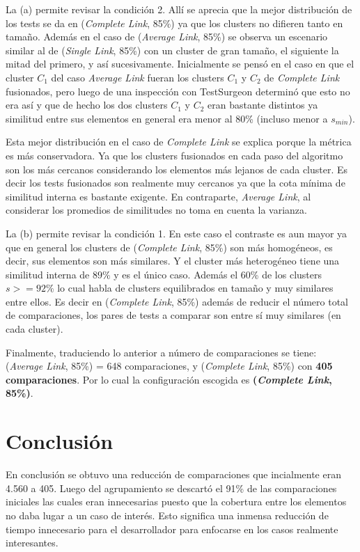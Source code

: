 \par La (a) permite revisar la condición 2. Allí se aprecia que la mejor distribución de los tests se da en (\emph{Complete Link}, 85\%) ya que los clusters no difieren tanto en tamaño. Además en el caso de (\emph{Average Link}, 85\%) se observa un escenario similar al de (\emph{Single Link}, 85\%) con un cluster de gran tamaño, el siguiente la mitad del primero, y así sucesivamente. Inicialmente se pensó en el caso en que el cluster $C_1$ del caso \emph{Average Link} fueran los clusters $C_1$ y $C_2$ de \emph{Complete Link} fusionados, pero luego de una inspección con TestSurgeon determinó que esto no era así y que de hecho los dos clusters $C_1$ y $C_2$ eran bastante distintos ya similitud entre sus elementos en general era menor al 80\% (incluso menor a $s_{min}$). 

\par Esta mejor distribución en el caso de \emph{Complete Link} se explica porque la métrica es más conservadora. Ya que los clusters fusionados en cada paso del algoritmo son los más cercanos considerando los elementos más lejanos de cada cluster. Es decir los tests fusionados son realmente muy cercanos ya que la cota mínima de similitud interna es bastante exigente. En contraparte, \emph{Average Link}, al considerar los promedios de similitudes no toma en cuenta la varianza.

\par La (b) permite revisar la condición 1. En este caso el contraste es aun mayor ya que en general los clusters de (\emph{Complete Link}, 85\%) son más homogéneos, es decir, sus elementos son más similares. Y el cluster más heterogéneo tiene una similitud interna de $89\%$ y es el único caso. Además el 60\% de los clusters $s >= 92\%$ lo cual habla de clusters equilibrados en tamaño y muy similares entre ellos. Es decir en (\emph{Complete Link}, 85\%) además de reducir el número total de comparaciones, los pares de tests a comparar son entre sí muy similares (en cada cluster).

\par Finalmente, traduciendo lo anterior a número de comparaciones se tiene: (\emph{Average Link}, 85\%) = 648 comparaciones, y (\emph{Complete Link}, 85\%) con \textbf{405 comparaciones}. Por lo cual la configuración escogida es {\bf (\emph{Complete Link}, 85\%)}.

\section{Conclusión}

\par En conclusión se obtuvo una reducción de comparaciones que incialmente eran 4.560 a 405. Luego del agrupamiento se descartó el 91\% de las comparaciones iniciales las cuales eran innecesarias puesto que la cobertura entre los elementos no daba lugar a un caso de interés. Esto significa una inmensa reducción de tiempo innecesario para el desarrollador para enfocarse en los casos realmente interesantes. 




